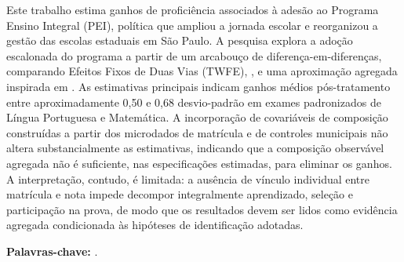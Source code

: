 ﻿\begin{resumo}

Este trabalho estima ganhos de proficiência associados à adesão ao Programa Ensino Integral (PEI), política que ampliou a jornada escolar e reorganizou a gestão das escolas estaduais em São Paulo. A pesquisa explora a adoção escalonada do programa a partir de um arcabouço de diferença-em-diferenças, comparando Efeitos Fixos de Duas Vias (TWFE), \textcite{callawaysantanna}, \textcite{santannazhao} e uma aproximação agregada inspirada em \textcite{santannaxu}. As estimativas principais indicam ganhos médios pós-tratamento entre aproximadamente 0,50 e 0,68 desvio-padrão em exames padronizados de Língua Portuguesa e Matemática. A incorporação de covariáveis de composição construídas a partir dos microdados de matrícula e de controles municipais não altera substancialmente as estimativas, indicando que a composição observável agregada não é suficiente, nas especificações estimadas, para eliminar os ganhos. A interpretação, contudo, é limitada: a ausência de vínculo individual entre matrícula e nota impede decompor integralmente aprendizado, seleção e participação na prova, de modo que os resultados devem ser lidos como evidência agregada condicionada às hipóteses de identificação adotadas.

\textbf{Palavras-chave:} \imprimirpalavraschavesresumo.
\end{resumo}
